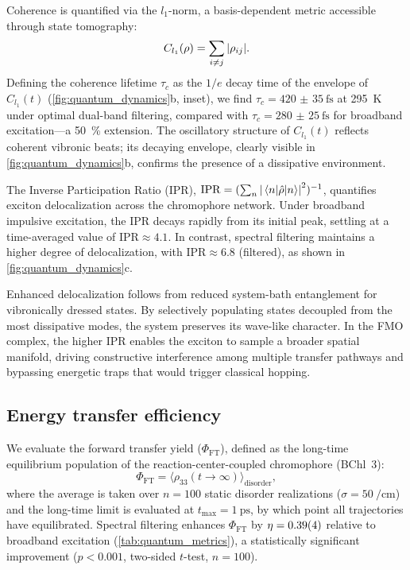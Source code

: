 \documentclass[journal=jpcl,manuscript=letter]{achemso}
\begin{document}
Coherence is quantified via the $l_1$-norm,\cite{Baumgratz2014} a basis-dependent metric accessible through state tomography:
\begin{equation}
C_{l_1}(\rho) = \sum_{i \neq j} \abs{\rho_{ij}}.
\label{eq:l1_coherence}
\end{equation}
Defining the coherence lifetime $\tau_c$ as the $1/e$ decay time of the envelope of $C_{l_1}(t)$ (\cref{fig:quantum_dynamics}b, inset), we find $\tau_c = \SI{420(35)}{\femto\second}$ at \SI{295}{\kelvin} under optimal dual-band filtering, compared with $\tau_c = \SI{280(25)}{\femto\second}$ for broadband excitation---a \SI{50}{\percent} extension. The oscillatory structure of $C_{l_1}(t)$ reflects coherent vibronic beats; its decaying envelope, clearly visible in \cref{fig:quantum_dynamics}b, confirms the presence of a dissipative environment.

The Inverse Participation Ratio (IPR), $\mathrm{IPR} = (\sum_n \abs{\mel{n}{\hat{\rho}}{n}}^2)^{-1}$, quantifies exciton delocalization across the chromophore network. Under broadband impulsive excitation, the IPR decays rapidly from its initial peak, settling at a time-averaged value of $\mathrm{IPR} \approx \num{4.1}$. In contrast, spectral filtering maintains a higher degree of delocalization, with $\mathrm{IPR} \approx \num{6.8}$ (filtered), as shown in \cref{fig:quantum_dynamics}c. 

Enhanced delocalization follows from reduced system-bath entanglement for vibronically dressed states. By selectively populating states decoupled from the most dissipative modes, the system preserves its wave-like character. In the FMO complex, the higher IPR enables the exciton to sample a broader spatial manifold, driving constructive interference among multiple transfer pathways and bypassing energetic traps that would trigger classical hopping.

\subsection*{Energy transfer efficiency}

We evaluate the forward transfer yield ($\Phi_{\mathrm{FT}}$), defined as the long-time equilibrium population of the reaction-center-coupled chromophore (BChl~3):
\begin{equation}
\Phi_{\mathrm{FT}} = \bigl\langle \rho_{33}(t \to \infty) \bigr\rangle_{\mathrm{disorder}},
\label{eq:ETE}
\end{equation}
where the average is taken over $n=100$ static disorder realizations ($\sigma = \SI{50}{\per\centi\meter}$) and the long-time limit is evaluated at $t_{\max} = \SI{1}{\pico\second}$, by which point all trajectories have equilibrated. Spectral filtering enhances $\Phi_{\mathrm{FT}}$ by $\eta = \num{0.39 \pm 0.04}$ relative to broadband excitation (\cref{tab:quantum_metrics}), a statistically significant improvement ($p < 0.001$, two-sided $t$-test, $n=100$).
\end{document}
